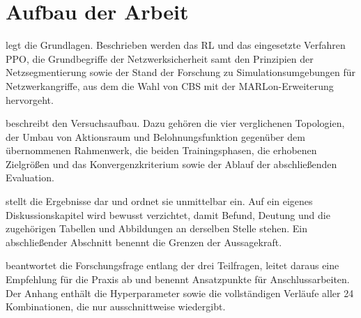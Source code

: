 \section{Aufbau der Arbeit}
\label{sec:aufbau}

 legt die Grundlagen. Beschrieben werden das \ac{RL}
und das eingesetzte Verfahren \ac{PPO}, die Grundbegriffe der
Netzwerksicherheit samt den Prinzipien der Netzsegmentierung sowie der Stand
der Forschung zu Simulationsumgebungen für Netzwerkangriffe, aus dem die Wahl
von \ac{CBS} mit der MARLon-Erweiterung hervorgeht.

 beschreibt den Versuchsaufbau. Dazu gehören die vier
verglichenen Topologien, der Umbau von Aktionsraum und Belohnungsfunktion
gegenüber dem übernommenen Rahmenwerk, die beiden Trainingsphasen, die
erhobenen Zielgrößen und das Konvergenzkriterium sowie der Ablauf der
abschließenden Evaluation.

 stellt die Ergebnisse dar und ordnet sie unmittelbar
ein. Auf ein eigenes Diskussionskapitel wird bewusst verzichtet, damit Befund,
Deutung und die zugehörigen Tabellen und Abbildungen an derselben Stelle
stehen. Ein abschließender Abschnitt benennt die Grenzen der Aussagekraft.

 beantwortet die Forschungsfrage entlang der drei Teilfragen,
leitet daraus eine Empfehlung für die Praxis ab und benennt Ansatzpunkte für
Anschlussarbeiten. Der Anhang enthält die Hyperparameter sowie die
vollständigen Verläufe aller 24 Kombinationen, die  nur
ausschnittweise wiedergibt.
